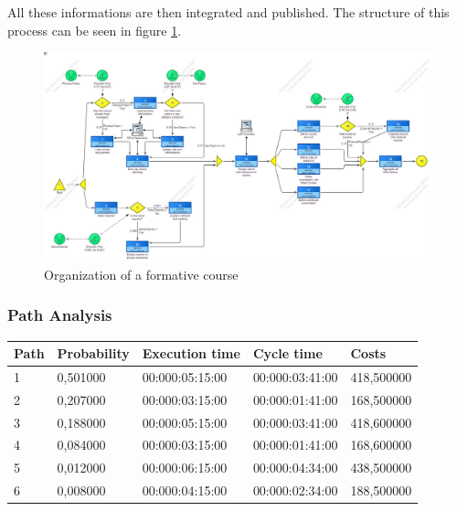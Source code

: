 All these informations are then integrated and published. The structure of
this process can be seen in figure \ref{2img:course_organization}.

\begin{figure}[!ht]
\centering
\includegraphics[scale=0.27, angle=90]{assign2/adonis/imgs/course_organization.jpg}
\caption{Organization of a formative course}
\label{2img:course_organization}
\end{figure}


\subsubsection{Path Analysis}

\begin{table}[ht!]
\centering
\begin{tabular}{|l|l|l|l|l|}
\hline
Path&Probability&Execution time&Cycle time&Costs\\
\hline
1&0,501000&00:000:05:15:00&00:000:03:41:00&418,500000\\
\hline
2&0,207000&00:000:03:15:00&00:000:01:41:00&168,500000\\
\hline
3&0,188000&00:000:05:15:00&00:000:03:41:00&418,600000\\
\hline
4&0,084000&00:000:03:15:00&00:000:01:41:00&168,600000\\
\hline
5&0,012000&00:000:06:15:00&00:000:04:34:00&438,500000\\
\hline
6&0,008000&00:000:04:15:00&00:000:02:34:00&188,500000\\
\hline
\end{tabular}
\end{table}


